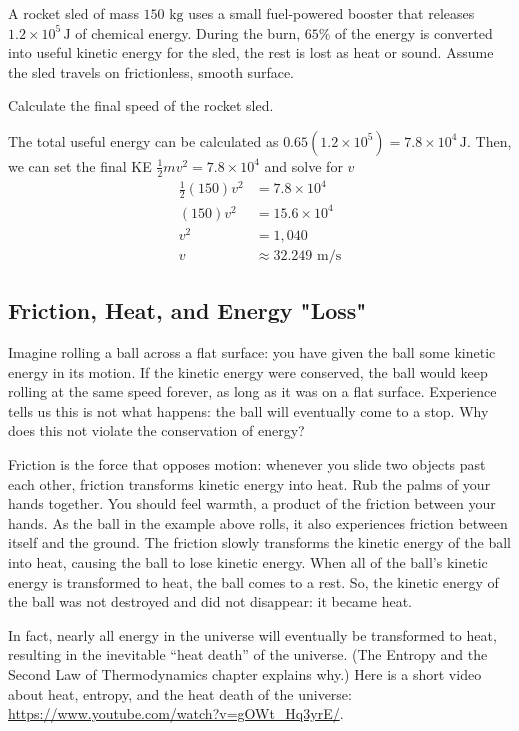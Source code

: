 \begin{Exercise}[title=Blast Off!, label=rocketsled]
  A rocket sled of mass $150 \text{ kg}$ uses a small fuel-powered booster that releases $1.2\times 10^5\,\text{J}$ of chemical energy. During the burn, $65\%$ of the energy is converted into useful kinetic energy for the sled, the rest is lost as heat or sound. Assume the sled travels on frictionless, smooth surface.

  Calculate the final speed of the rocket sled.
\end{Exercise}
\begin{Answer}[ref=rocketsled]
The total useful energy can be calculated as $0.65(1.2\times 10^5) = 7.8\times 10^4\,\text{J}$. Then, we can set the final KE $\frac{1}{2}mv^2 = 7.8\times 10^4$ and solve for $v$
\begin{align*}
  \frac{1}{2}(150)v^2 &= 7.8\times 10^4\\
  (150)v^2 &= 15.6 \times 10^4 \\ 
  v^2 &=1,040 \\ 
  v&\approx32.249 \text{ m/s}
\end{align*}
\end{Answer}

\subsection{Friction, Heat, and Energy "Loss"}
Imagine rolling a ball across a flat surface: you have given the ball some 
kinetic energy in its motion. If the kinetic energy were conserved, the ball 
would keep rolling at the same speed forever, as long as it was on a flat 
surface. Experience tells us this is not what happens: the ball will eventually 
come to a stop. Why does this not violate the conservation of energy?

Friction is the force that opposes motion: whenever you slide two objects past 
each other, friction transforms kinetic energy into heat. Rub the palms of your 
hands together. You should feel warmth, a product of the friction between your 
hands. As the ball in the example above rolls, it also experiences friction 
between itself and the ground. The friction slowly transforms the kinetic energy 
of the ball into heat, causing the ball to lose kinetic energy. When all of the 
ball's kinetic energy is transformed to heat, the ball comes to a rest. So, the 
kinetic energy of the ball was not destroyed and did not disappear: it became heat. 

In fact, nearly all energy in the universe will eventually be transformed to heat,
resulting in the inevitable ``heat death'' of the universe. (The Entropy and
the Second Law of Thermodynamics chapter explains why.) Here is a short video about heat, entropy, and the
heat death of the universe: \url{https://www.youtube.com/watch?v=gOWt_Hq3yrE/}. 

